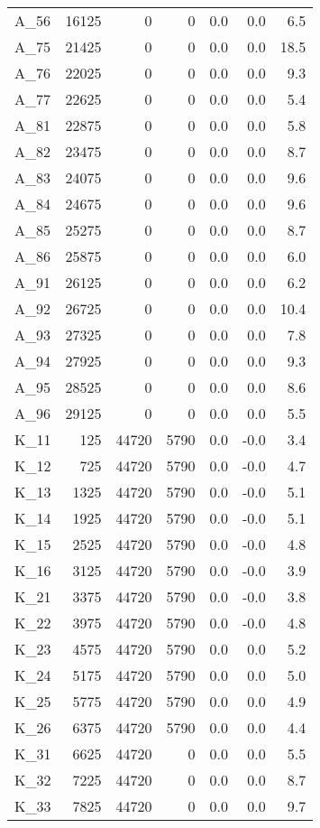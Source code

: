 \begin{tabular}{lrrrrrr}
A\_56 & 16125 & 0 & 0 & 0.0 & 0.0 & 6.5 \\
A\_75 & 21425 & 0 & 0 & 0.0 & 0.0 & 18.5 \\
A\_76 & 22025 & 0 & 0 & 0.0 & 0.0 & 9.3 \\
A\_77 & 22625 & 0 & 0 & 0.0 & 0.0 & 5.4 \\
A\_81 & 22875 & 0 & 0 & 0.0 & 0.0 & 5.8 \\
A\_82 & 23475 & 0 & 0 & 0.0 & 0.0 & 8.7 \\
A\_83 & 24075 & 0 & 0 & 0.0 & 0.0 & 9.6 \\
A\_84 & 24675 & 0 & 0 & 0.0 & 0.0 & 9.6 \\
A\_85 & 25275 & 0 & 0 & 0.0 & 0.0 & 8.7 \\
A\_86 & 25875 & 0 & 0 & 0.0 & 0.0 & 6.0 \\
A\_91 & 26125 & 0 & 0 & 0.0 & 0.0 & 6.2 \\
A\_92 & 26725 & 0 & 0 & 0.0 & 0.0 & 10.4 \\
A\_93 & 27325 & 0 & 0 & 0.0 & 0.0 & 7.8 \\
A\_94 & 27925 & 0 & 0 & 0.0 & 0.0 & 9.3 \\
A\_95 & 28525 & 0 & 0 & 0.0 & 0.0 & 8.6 \\
A\_96 & 29125 & 0 & 0 & 0.0 & 0.0 & 5.5 \\
K\_11 & 125 & 44720 & 5790 & 0.0 & -0.0 & 3.4 \\
K\_12 & 725 & 44720 & 5790 & 0.0 & -0.0 & 4.7 \\
K\_13 & 1325 & 44720 & 5790 & 0.0 & -0.0 & 5.1 \\
K\_14 & 1925 & 44720 & 5790 & 0.0 & -0.0 & 5.1 \\
K\_15 & 2525 & 44720 & 5790 & 0.0 & -0.0 & 4.8 \\
K\_16 & 3125 & 44720 & 5790 & 0.0 & -0.0 & 3.9 \\
K\_21 & 3375 & 44720 & 5790 & 0.0 & -0.0 & 3.8 \\
K\_22 & 3975 & 44720 & 5790 & 0.0 & -0.0 & 4.8 \\
K\_23 & 4575 & 44720 & 5790 & 0.0 & 0.0 & 5.2 \\
K\_24 & 5175 & 44720 & 5790 & 0.0 & 0.0 & 5.0 \\
K\_25 & 5775 & 44720 & 5790 & 0.0 & 0.0 & 4.9 \\
K\_26 & 6375 & 44720 & 5790 & 0.0 & 0.0 & 4.4 \\
K\_31 & 6625 & 44720 & 0 & 0.0 & 0.0 & 5.5 \\
K\_32 & 7225 & 44720 & 0 & 0.0 & 0.0 & 8.7 \\
K\_33 & 7825 & 44720 & 0 & 0.0 & 0.0 & 9.7 \\

\end{tabular}
